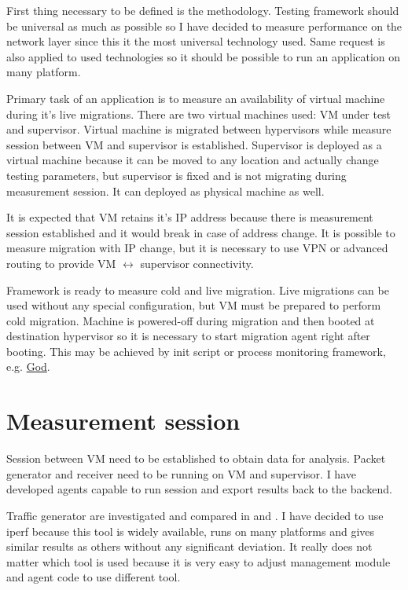 
First thing necessary to be defined is the methodology. Testing framework should be universal as much as possible so I have decided to measure performance on the network layer since this it the most universal technology used. Same request is also applied to used technologies so it should be possible to run an application on many platform. 

Primary task of an application is to measure an availability of virtual machine during it's live migrations. There are two virtual machines used: \Ac{VM} under test and supervisor. Virtual machine is migrated between hypervisors while measure session between \Ac{VM} and supervisor is established. Supervisor is deployed as a virtual machine because it can be moved to any location and actually change testing parameters, but supervisor is fixed and is not migrating during measurement session. It can deployed as physical machine as well.

It is expected that \Ac{VM} retains it's \Ac{IP} address because there is measurement session established and it would break in case of address change. It is possible to measure migration with \Ac{IP} change, but it is necessary to use \Ac{VPN} or advanced routing to provide \Ac{VM} $\leftrightarrow$ supervisor connectivity.

Framework is ready to measure cold and live migration. Live migrations can be used without any special configuration, but \Ac{VM} must be prepared to perform cold migration. Machine is powered-off during migration and then booted at destination hypervisor so it is necessary to start migration agent right after booting. This may be achieved by init script or process monitoring framework, e.g. \href{http://godrb.com/}{God}.

\section{Measurement session}
Session between \Ac{VM} need to be established to obtain data for analysis. Packet generator and receiver need to be running on \Ac{VM} and supervisor. I have developed agents capable to run session and export results back to the backend.

Traffic generator are investigated and compared in \cite{traffic-generators1} and \cite{traffic-generators2}. I have decided to use iperf because this tool is widely available, runs on many platforms and gives similar results as others without any significant deviation. It really does not matter which tool is used because it is very easy to adjust management module and agent code to use different tool.

